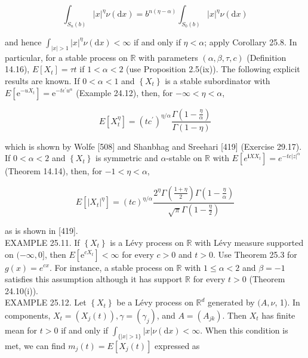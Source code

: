 \documentclass[a4paper,11pt]{article}
\begin{document}
$$
    \int_{S_{n}(b)}|x|^{\eta} \nu(\mathrm{d} x)=b^{n(\eta-\alpha)} \int_{S_{0}(b)}|x|^{\eta} \nu(\mathrm{d} x)
$$

and hence $\int_{|x|>1}|x|^{\eta} \nu(\mathrm{d} x)<\infty$ if and only if $\eta<\alpha$; apply
Corollary 25.8. In particular, for a stable process on $\mathbb{R}$ with parameters
$(\alpha, \beta, \tau, c)$ (Definition 14.16), $E\left[X_{t}\right]=\tau t$ if
$1<\alpha<2$ (use Proposition 2.5(ix)). The following explicit results are known.
If $0<\alpha<1$ and $\left\{X_{t}\right\}$ is a stable subordinator with
$E\left[\mathrm{e}^{-u X_{t}}\right]=\mathrm{e}^{-t \epsilon^{\prime} u^{\alpha}}$ (Example 24.12),
then, for $-\infty<\eta<\alpha$,

\begin{equation*}
    E\left[X_{t}^{\eta}\right]=\left(t c^{\prime}\right)^{\eta / \alpha} \frac{\Gamma\left(1-\frac{\eta}{\alpha}\right)}{\Gamma(1-\eta)} \tag{25.5}
\end{equation*}


which is shown by Wolfe [508] and Shanbhag and Sreehari [419] (Exercise 29.17).
If $0<\alpha<2$ and $\left\{X_{t}\right\}$ is symmetric and $\alpha$-stable on $\mathbb{R}$
with $E\left[e^{\mathbf{i} X X_{t}}\right]=e^{-t c|z|^{\alpha}}$ (Theorem 14.14), then, for $-1<\eta<\alpha$,

\begin{equation*}
    E\left[\left|X_{t}\right|^{\eta}\right]=(t c)^{\eta / \alpha} \frac{2^{\eta} \Gamma\left(\frac{1+\eta}{2}\right) \Gamma\left(1-\frac{\eta}{\alpha}\right)}{\sqrt{\pi} \Gamma\left(1-\frac{\eta}{2}\right)} \tag{25.6}
\end{equation*}

as is shown in [419]. \\

EXAMPLE 25.11. If $\left\{X_{t}\right\}$ is a Lévy process on $\mathbb{R}$ with Lévy
measure supported on $(-\infty, 0]$, then $E\left[\mathrm{e}^{c X_{t}}\right]<\infty$
for every $c>0$ and $t>0$. Use Theorem 25.3 for $g(x)=e^{c x}$. For instance, a stable
process on $\mathbb{R}$ with $1 \leq \alpha<2$ and $\beta=-1$ satisfies this assumption
although it has support $\mathbb{R}$ for every $t>0$ (Theorem 24.10(i)). \\

EXAMPLE 25.12. Let $\left\{X_{t}\right\}$ be a Lévy process on $\mathbb{R}^{d}$ generated
by $(A, \nu$, 1). In components, $X_{t}=\left(X_{j}(t)\right), \gamma=\left(\gamma_{j}\right)$,
and $A=\left(A_{j k}\right)$. Then $X_{t}$ has finite mean for $t>0$
if and only if $\int_{\{|x| >1\}} |x| \nu(\mathrm{d} x)<\infty$.
When this condition is met, we can find $m_{j}(t)=E\left[X_{j}(t)\right]$ expressed as
\end{document}
